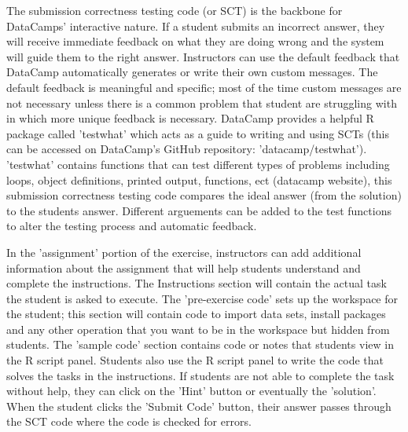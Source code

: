 \documentclass[12pt]{article}
\begin{document}
The submission correctness testing code (or SCT) is the backbone for DataCamps' interactive nature. If a student submits an incorrect answer, they will 
receive immediate feedback on what they are doing wrong and the system will guide them to the right answer. Instructors can use the default feedback
that DataCamp automatically generates or write their own custom messages. The default feedback is meaningful and specific; most of the time custom 
messages are not necessary unless there is a common problem that student are struggling with in which more unique feedback is necessary. 
DataCamp provides a helpful R package called 'testwhat' which acts as a guide to writing and using SCTs (this can be accessed on DataCamp's GitHub 
repository: 'datacamp/testwhat'). 
'testwhat' contains functions that can test different types of problems including loops, object definitions, printed output, functions, ect 
(datacamp website), this submission correctness testing code compares the ideal answer (from the solution) to the students answer. Different
arguements can be added to the test functions to alter the testing process and automatic feedback.


In the 'assignment' portion of the exercise, instructors can add additional information about the assignment that will help
students understand and complete the instructions. The Instructions section will contain the actual task the student is
asked to execute. The 'pre-exercise code' sets up the workspace for the student; this section will contain code to import
data sets, install packages and any other operation that you want to be in the workspace but hidden from students. The 'sample
code' section contains code or notes that students view in the R script panel. Students also use the R script panel to write
the code that solves the tasks in the instructions. If students are not able to complete the task without help, they can click
on the 'Hint' button or eventually the 'solution'. When the student clicks the 'Submit Code' button, their answer passes through the SCT code where 
the code is checked for errors.



\begin{figure}
\end{figure}
\end{document}
